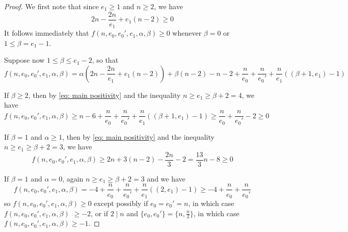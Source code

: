 \documentclass[12pt]{amsart}
\numberwithin{equation}{section}
\theoremstyle{definition}
\begin{document}
\begin{proof} We first note that since $e_1\geq 1$ and $n\geq 2$, we have
    \begin{equation}\label{eq: main positivity}
        2n-\frac{2n}{e_1}+e_1(n-2)\geq 0
    \end{equation}
    It follows immediately that $f(n,e_0,e_0',e_1,\alpha,\beta)\geq 0$ whenever $\beta=0$ or $1\leq\beta=e_1-1$.
    
    Suppose now $1\leq\beta\leq e_1-2$, so that
    \[f(n,e_0,e_0',e_1,\alpha,\beta)=\alpha(2n-\frac{2n}{e_1}+e_1(n-2))+\beta(n-2)-n-2+\frac{n}{e_0}+\frac{n}{e_0'}+\frac{n}{e_1}((\beta+1,e_1)-1)\]

    If $\beta\geq 2$, then by \eqref{eq: main positivity} and the inequality $n\geq e_1\geq \beta+2=4$,
    we have
    \begin{equation}\label{equation: b geq 2 bound}
    f(n,e_0,e_0',e_1,\alpha,\beta)\geq n-6+\frac{n}{e_0}+\frac{n}{e_0'}+\frac{n}{e_1}((\beta+1,e_1)-1)\geq \frac{n}{e_0}+\frac{n}{e_0'}-2\geq 0
    \end{equation}
    
    If $\beta=1$ and $\alpha\geq 1$, then by \eqref{eq: main positivity} and the inequality $n\geq e_1\geq\beta+2=3$, we have
    \begin{equation}\label{equation: bound b=1,a>=1}
        f(n,e_0,e_0',e_1,\alpha,\beta)\geq2n+3(n-2)-\frac{2n}{3}-2=\frac{13}{3}n-8\geq0
    \end{equation}
    
    If $\beta=1$ and $\alpha=0$, again $n\geq e_1\geq\beta+2=3$ and we have
    \begin{equation}\label{equation: bound $j=1$}
        f(n,e_0,e_0',e_1,\alpha,\beta)
        =-4+\frac{n}{e_0}+\frac{n}{e_0'}+\frac{n}{e_1}((2,e_1)-1)
        \geq-4+\frac{n}{e_0}+\frac{n}{e_0'}
    \end{equation}
    so $f(n,e_0,e_0',e_1,\alpha,\beta)\geq0$ except possibly if $e_0=e_0'=n$, in which case $f(n,e_0,e_0',e_1,\alpha,\beta)$ $\geq-2$, or if $2\mid n$ and $\{e_0,e_0'\}=\{n,\frac{n}{2}\}$, in which case $f(n,e_0,e_0',e_1,\alpha,\beta)\geq-1$.
\end{proof}
\end{document}
